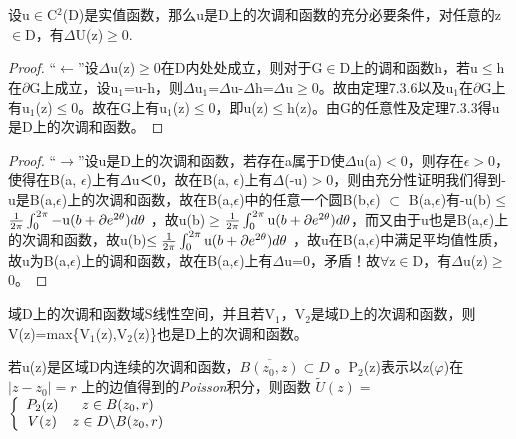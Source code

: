 \chapter{}

    \begin{theorem}
        设u$\in{}$C$^{2}$(D)是实值函数，那么u是D上的次调和函数的充分必要条件，对任意的z$\in{}$D，有$\Delta{}$U(z)$\geq{}$0.
    \end{theorem}

    \begin{proof}
        ``$\leftarrow{}$''设$\Delta{}$u(z)$\geq{}$0在D内处处成立，则对于G$\in{}$D上的调和函数h，若u$\leq{}$h在$\partial{}$G上成立，设u$_{1}$=u-h，则$\Delta{}$u$_{1}$=$\Delta{}$u-$\Delta{}$h=$\Delta{}$u$\geq{}$0。故由定理7.3.6以及u$_{1}$在$\partial{}$G上有u$_{1}$(z)$\leq{}$0。故在G上有u$_{1}$(z)$\leq{}$0，即u(z)$\leq{}$h(z)。由G的任意性及定理7.3.3得u是D上的次调和函数。
    \end{proof}

    \begin{proof}
       ``$\rightarrow{}$''设u是D上的次调和函数，若存在a属于D使$\Delta{}$u(a)$<$0，则存在$\epsilon{}$$>$0，使得在B(a,
$\epsilon{}$)上有$\Delta{}$u＜0，故在B(a,
$\epsilon{}$)上有$\Delta{}$(-u)$>$0，则由充分性证明我们得到-u是B(a,$\epsilon{}$)上的次调和函数，故在B(a,$\epsilon{}$)中的任意一个圆B(b,$\epsilon{}$)
$\subset{}$ B(a,$\epsilon{}$)有-u(b)$\leq{}$$\frac{1}{{2\pi }}\int_0^{2\pi }
{{\rm{ - u}}(b + \partial {e^{2\theta }})d\theta } $
，故u(b)$\geq{}$$\frac{1}{{2\pi }}\int_0^{2\pi } {{\rm{u}}(b + \partial {e^{2\theta
}})d\theta } $，而又由于u也是B(a,$\epsilon{}$)上的次调和函数，故u(b)$ \le \frac{1}{{2\pi
}}\int_0^{2\pi } {{\rm{u}}(b + \partial {e^{2\theta }}} )d\theta $
，故u在B(a,$\epsilon{}$)中满足平均值性质，故u为B(a,$\epsilon{}$)上的调和函数，故在B(a,$\epsilon{}$)上有$\Delta{}$u=0，矛盾！故$\forall{}$z$\in{}$D，有$\Delta{}$u(z)$\geq{}$0。
    \end{proof}

\begin{theorem}
        域D上的次调和函数域S线性空间，并且若V$_{1}$，V$_{2}$是域D上的次调和函数，则\\V(z)=max\{V$_{1}$(z),V$_{2}$(z)\}也是D上的次调和函数。
    \end{theorem}

\begin{theorem}
			若u(z)是区域D内连续的次调和函数，$\overline {B({z_0},z)}  \subset D$
。P$_{2}$(z)表示以z($\varphi $)在$\left| {z - {z_0}} \right| = r$
上的边值得到的\emph{Poisson}积分，则函数
$\widetilde U(z) = $ $\left\{ \begin{array}{cc}
{P_2}({\rm{z}}) & z \in B({z_0},r)\\
V(z) & z \in D\backslash B({z_0},r)
\end{array} \right.$ 
\end{theorem}


